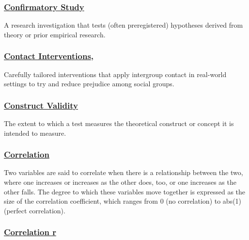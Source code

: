 \documentclass[
  letterpaper,
]{book}
\begin{document}
\subsubsection*{\texorpdfstring{\hyperref[def-confirmatorystudy]{Confirmatory
Study}}{Confirmatory Study}}\label{confirmatory-study}

A research investigation that tests (often preregistered) hypotheses
derived from theory or prior empirical research.

\subsubsection*{\texorpdfstring{\hyperref[def-contactinterventions]{Contact
Interventions},}{Contact Interventions,}}\label{contact-interventions}

Carefully tailored interventions that apply intergroup contact in
real-world settings to try and reduce prejudice among social groups.

\subsubsection*{\texorpdfstring{\hyperref[def-constructvalidity]{Construct
Validity}}{Construct Validity}}\label{construct-validity}

The extent to which a test measures the theoretical construct or concept
it is intended to measure.

\subsubsection*{\texorpdfstring{\hyperref[def-correlation]{Correlation}}{Correlation}}\label{correlation}

Two variables are said to correlate when there is a relationship between
the two, where one increases or increases as the other does, too, or one
increases as the other falls. The degree to which these variables move
together is expressed as the size of the correlation coefficient, which
ranges from 0 (no correlation) to abs(1) (perfect correlation).

\subsubsection*{\texorpdfstring{\hyperref[def-correlationr]{Correlation
r}}{Correlation r}}\label{correlation-r}
\end{document}
